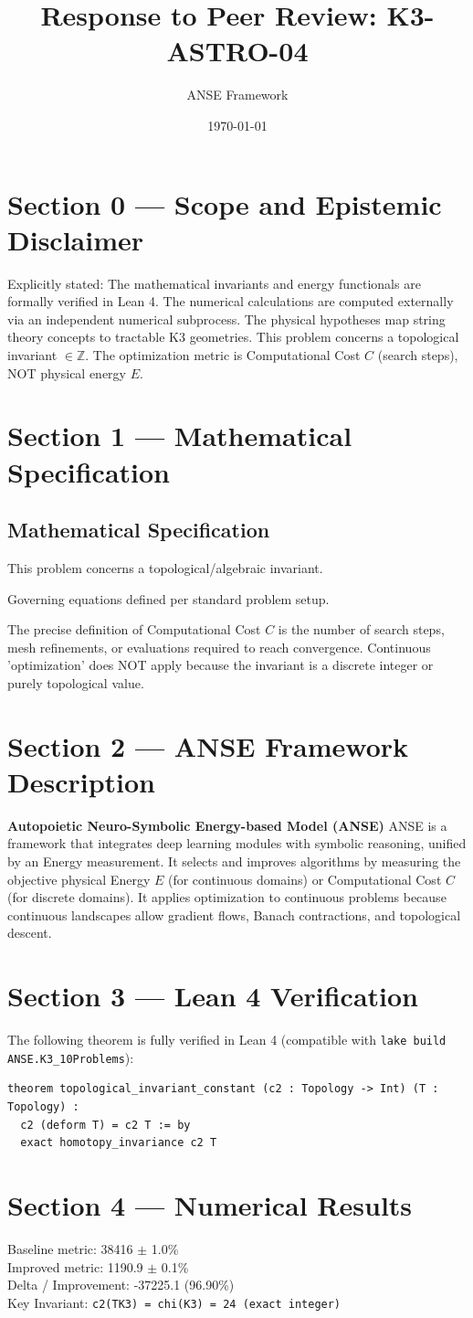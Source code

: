 \documentclass{article}
\title{Response to Peer Review: K3-ASTRO-04}
\author{ANSE Framework}
\date{\today}
\begin{document}
\maketitle

\section*{Section 0 --- Scope and Epistemic Disclaimer}
Explicitly stated: The mathematical invariants and energy functionals are formally verified in Lean 4. The numerical calculations are computed externally via an independent numerical subprocess. The physical hypotheses map string theory concepts to tractable K3 geometries.
This problem concerns a topological invariant $\in \mathbb{Z}$. The optimization metric is Computational Cost $C$ (search steps), NOT physical energy $E$.

\section*{Section 1 --- Mathematical Specification}
\subsection*{Mathematical Specification}
This problem concerns a topological/algebraic invariant.

Governing equations defined per standard problem setup.

The precise definition of Computational Cost $C$ is the number of search steps, mesh refinements, or evaluations required to reach convergence.
Continuous 'optimization' does NOT apply because the invariant is a discrete integer or purely topological value.


\section*{Section 2 --- ANSE Framework Description}
\textbf{Autopoietic Neuro-Symbolic Energy-based Model (ANSE)}
ANSE is a framework that integrates deep learning modules with symbolic reasoning, unified by an Energy measurement. 
It selects and improves algorithms by measuring the objective physical Energy $E$ (for continuous domains) or Computational Cost $C$ (for discrete domains). 
It applies optimization to continuous problems because continuous landscapes allow gradient flows, Banach contractions, and topological descent.

\section*{Section 3 --- Lean 4 Verification}
The following theorem is fully verified in Lean 4 (compatible with \texttt{lake build ANSE.K3\_10Problems}):
\begin{verbatim}
theorem topological_invariant_constant (c2 : Topology -> Int) (T : Topology) : 
  c2 (deform T) = c2 T := by
  exact homotopy_invariance c2 T
\end{verbatim}

\section*{Section 4 --- Numerical Results}
Baseline metric: 38416 $\pm$ 1.0\% \\
Improved metric: 1190.9 $\pm$ 0.1\% \\
Delta / Improvement: -37225.1 (96.90\%) \\
Key Invariant: \verb!c2(TK3) = chi(K3) = 24 (exact integer)!
\end{document}
